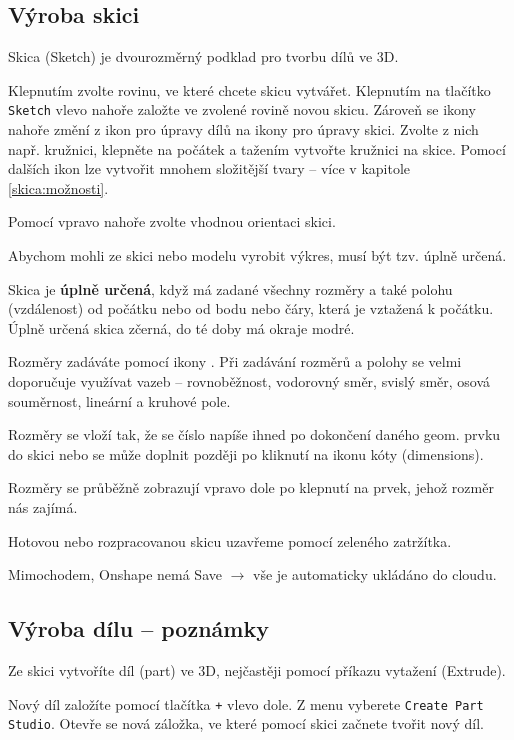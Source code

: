 \subsection{Výroba skici} \label{skica:vyroba}


Skica (Sketch)  je dvourozměrný podklad pro tvorbu dílů ve 3D. 

Klepnutím zvolte rovinu, ve které chcete skicu vytvářet. Klepnutím na tlačítko {\tt Sketch} vlevo nahoře založte ve zvolené rovině novou skicu. 
Zároveň se ikony nahoře změní z ikon pro úpravy dílů na ikony pro úpravy skici. Zvolte z nich např. kružnici, klepněte na počátek a tažením vytvořte kružnici na skice. 
Pomocí dalších ikon lze vytvořit mnohem složitější tvary -- více v kapitole \ref{skica:možnosti}.

Pomocí  vpravo nahoře zvolte vhodnou orientaci skici. 

Abychom mohli ze skici nebo modelu vyrobit výkres, musí být tzv. úplně určená.

Skica je \textbf{úplně určená}, když má zadané všechny rozměry a také polohu (vzdálenost) od počátku nebo od bodu nebo čáry, která je vztažená k počátku.
Úplně určená skica zčerná, do té doby má okraje modré.  

Rozměry zadáváte pomocí ikony .
Při zadávání rozměrů a polohy se velmi doporučuje využívat vazeb -- rovnoběžnost, vodorovný směr, svislý směr, osová souměrnost, lineární a kruhové pole. 

Rozměry se vloží tak, že se číslo napíše ihned po dokončení daného geom. prvku do skici 
nebo se může doplnit později po kliknutí na ikonu kóty (dimensions).

Rozměry se průběžně zobrazují vpravo dole po klepnutí na prvek, jehož rozměr nás zajímá. 

Hotovou nebo rozpracovanou skicu uzavřeme pomocí zeleného zatržítka. 

Mimochodem, Onshape nemá Save $\rightarrow$ vše je automaticky ukládáno do cloudu.

\subsection{Výroba dílu  -- poznámky} \label{dil:vyroba}

Ze skici vytvoříte díl (part) ve 3D, nejčastěji pomocí příkazu vytažení (Extrude). 

Nový díl založíte pomocí tlačítka \texttt{+} vlevo dole. Z menu vyberete {\tt Create Part Studio}. Otevře se nová záložka, ve které pomocí skici začnete tvořit nový díl.  

